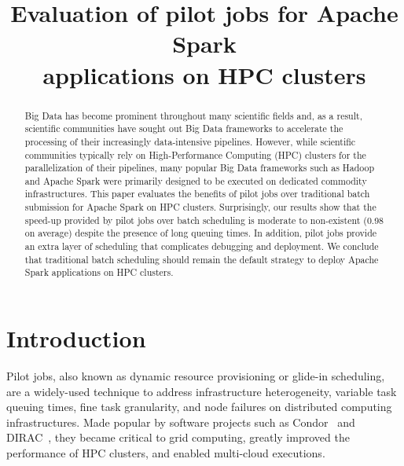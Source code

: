 \documentclass{IEEEtran}
\begin{document}
\title{Evaluation of pilot jobs for Apache Spark\\ applications on HPC clusters}
\author{
    \IEEEauthorblockA{}
}
\maketitle

\begin{abstract}
    Big Data has become prominent throughout many scientific fields and, as
    a result, scientific communities have sought out Big Data frameworks to
    accelerate the processing of their increasingly data-intensive
    pipelines. However, while scientific communities typically rely on
    High-Performance Computing (HPC) clusters for the parallelization of
    their pipelines, many popular Big Data frameworks such as Hadoop and
    Apache Spark were primarily designed to be executed on dedicated
    commodity infrastructures. This paper evaluates the benefits of pilot
    jobs over traditional batch submission for Apache Spark on HPC
    clusters. Surprisingly, our results show that the speed-up provided by
    pilot jobs over batch scheduling is moderate to non-existent (0.98 on
    average) despite the presence of long queuing times. In addition, pilot
    jobs provide an extra layer of scheduling that complicates debugging
    and deployment. We conclude that traditional batch scheduling should
    remain the default strategy to deploy Apache Spark applications on
    HPC clusters.

\end{abstract}

\section{Introduction}

Pilot jobs, also known as dynamic resource provisioning or glide-in
scheduling, are a widely-used technique to address infrastructure
heterogeneity, variable task queuing times, fine task granularity, and node
failures on distributed computing infrastructures. Made popular by software
projects such as Condor~\cite{thain2005distributed} and DIRAC~\cite{casajus2010dirac}, they
became critical to grid computing, greatly improved the performance of HPC
clusters, and enabled multi-cloud executions. 
\end{document}

